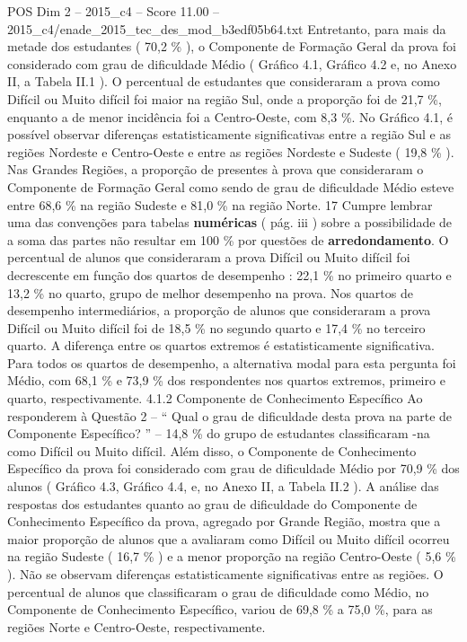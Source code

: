 \begin{textsample}{POS Dim 2 – 2015\_c4 – Score 11.00 – 2015\_c4/enade\_2015\_tec\_des\_mod\_b3edf05b64.txt}
Entretanto, para mais da metade dos estudantes ( 70,2 \% ), o Componente de Formação Geral da prova foi considerado com grau de dificuldade Médio ( Gráfico 4.1, Gráfico 4.2 e, no Anexo II, a Tabela II.1 ).
O percentual de estudantes que consideraram a prova como Difícil ou Muito difícil foi maior na região Sul, onde a proporção foi de 21,7 \%, enquanto a de menor incidência foi a Centro-Oeste, com 8,3 \%.
No Gráfico 4.1, é possível observar diferenças estatisticamente significativas entre a região Sul e as regiões Nordeste e Centro-Oeste e entre as regiões Nordeste e Sudeste ( 19,8 \% ).
Nas Grandes Regiões, a proporção de presentes à prova que consideraram o Componente de Formação Geral como sendo de grau de dificuldade Médio esteve entre 68,6 \% na região Sudeste e 81,0 \% na região Norte. 17 Cumpre lembrar uma das convenções para tabelas \textbf{numéricas} ( pág. iii ) sobre a possibilidade de a soma das partes não resultar em 100 \% por questões de \textbf{arredondamento}.
O percentual de alunos que consideraram a prova Difícil ou Muito difícil foi decrescente em função dos quartos de desempenho : 22,1 \% no primeiro quarto e 13,2 \% no quarto, grupo de melhor desempenho na prova.
Nos quartos de desempenho intermediários, a proporção de alunos que consideraram a prova Difícil ou Muito difícil foi de 18,5 \% no segundo quarto e 17,4 \% no terceiro quarto.
A diferença entre os quartos extremos é estatisticamente significativa.
Para todos os quartos de desempenho, a alternativa modal para esta pergunta foi Médio, com 68,1 \% e 73,9 \% dos respondentes nos quartos extremos, primeiro e quarto, respectivamente. 4.1.2 Componente de Conhecimento Específico Ao responderem à Questão 2 – “ Qual o grau de dificuldade desta prova na parte de Componente Específico? ” – 14,8 \% do grupo de estudantes classificaram -na como Difícil ou Muito difícil.
Além disso, o Componente de Conhecimento Específico da prova foi considerado com grau de dificuldade Médio por 70,9 \% dos alunos ( Gráfico 4.3, Gráfico 4.4, e, no Anexo II, a Tabela II.2 ).
A análise das respostas dos estudantes quanto ao grau de dificuldade do Componente de Conhecimento Específico da prova, agregado por Grande Região, mostra que a maior proporção de alunos que a avaliaram como Difícil ou Muito difícil ocorreu na região Sudeste ( 16,7 \% ) e a menor proporção na região Centro-Oeste ( 5,6 \% ).
Não se observam diferenças estatisticamente significativas entre as regiões.
O percentual de alunos que classificaram o grau de dificuldade como Médio, no Componente de Conhecimento Específico, variou de 69,8 \% a 75,0 \%, para as regiões Norte e Centro-Oeste, respectivamente.

\end{textsample}
